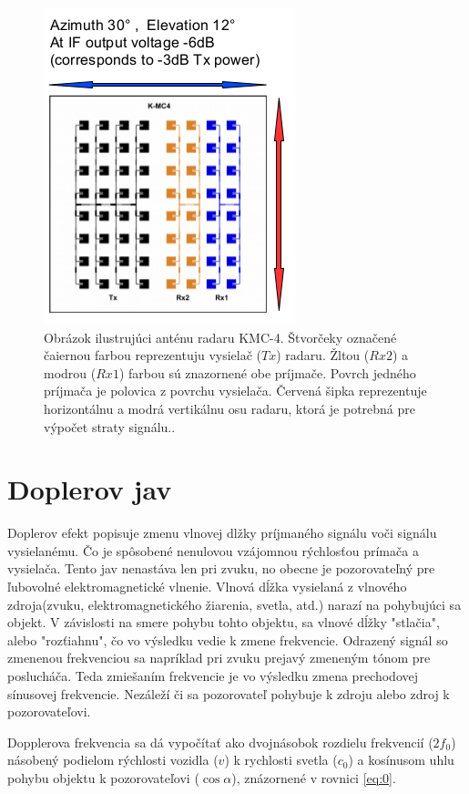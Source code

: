     \begin{figure}[h!]
        \centering
        \includegraphics[width=.45\textwidth]{obrazky-figures/kmc4_odchylka.png}
        \caption{Obrázok ilustrujúci anténu radaru KMC-4. Štvorčeky označené čaiernou farbou reprezentuju vysielač ($Tx$) radaru. Žltou ($Rx2$) a modrou ($Rx1$) farbou sú znazornené obe príjmače. Povrch jedného príjmača je polovica z povrchu vysielača. 
        Červená šipka reprezentuje horizontálnu a modrá vertikálnu osu radaru, ktorá je potrebná pre výpočet straty signálu.\cite{kmc4sheet}.}
        \label{fig:kmc4_odchylka}
    \end{figure}

  \section{Doplerov jav}
  \hspace{0.6cm}Doplerov efekt popisuje zmenu vlnovej dlžky príjmaného signálu voči signálu vysielanému. Čo je spôsobené nenulovou vzájomnou rýchlosťou prímača a vysielača.
  Tento jav nenastáva len pri zvuku, no obecne je pozorovateľný pre ľubovolné elektromagnetické vlnenie. 
  Vlnová dĺžka vysielaná z vlnového zdroja(zvuku, elektromagnetického žiarenia, svetla, atd.) narazí na pohybujúci sa objekt. V závislosti na smere pohybu tohto objektu, sa vlnové dĺžky "stlačia", alebo "rozťiahnu", čo vo výsledku vedie k zmene frekvencie. Odrazený signál so zmenenou frekvenciou sa napríklad pri zvuku prejavý zmeneným tónom pre poslucháča. Teda zmiešaním frekvencie je vo výsledku zmena prechodovej sínusovej frekvencie. Nezáleží či sa pozorovateľ pohybuje k zdroju alebo zdroj k pozorovateľovi\cite{radarsensing}\cite{radarsystems}.
  
  Dopplerova frekvencia sa dá vypočítať ako dvojnásobok rozdielu frekvencií ($2 f_{0}$) násobený podielom rýchlosti vozidla ($v$) k rychlosti svetla ($c_{0}$) a kosínusom uhlu pohybu objektu k pozorovateľovi ($\cos \alpha$), znázornené v rovnici \ref{eq:0}.


